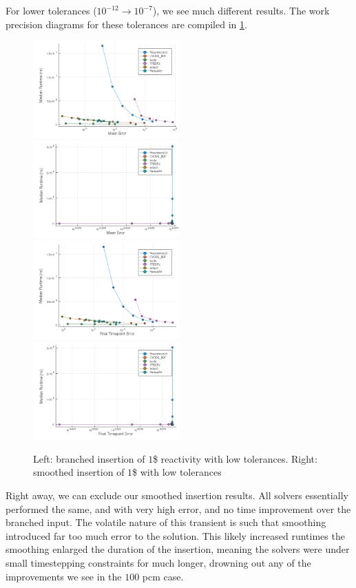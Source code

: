 \documentclass[review,onefignum,onetabnum]{siamart171218}
\begin{document}
For lower tolerances ($10^{-12} \rightarrow 10^{-7}$), we see much different results.
The work precision diagrams for these tolerances are compiled in \cref{fig:low-tol-both-dollar}.
\begin{figure}
  \includegraphics[width=0.5\textwidth]{../plots/work-precision/-low_tolerance_421pcm.png}
  \includegraphics[width=0.5\textwidth]{../plots/work-precision/-low_tolerance_421pcm_tanh.png}
  \includegraphics[width=0.5\textwidth]{../plots/work-precision/final_tp-low_tolerance_421pcm.png}
  \includegraphics[width=0.5\textwidth]{../plots/work-precision/final_tp-low_tolerance_421pcm_tanh.png}
  \caption{Left: branched insertion of $1$\$ reactivity with low tolerances.
  Right: smoothed insertion of $1$\$ with low tolerances}
  \label{fig:low-tol-both-dollar}
\end{figure}
Right away, we can exclude our smoothed insertion results. All solvers essentially performed
the same, and with very high error, and no time improvement over the branched input.
The volatile nature of this transient is such that smoothing introduced far too much
error to the solution. This likely increased runtimes the smoothing enlarged the duration
of the insertion, meaning the solvers were under small timestepping constraints for
much longer, drowning out any of the improvements we see in the $100$ pcm case. \\
\end{document}
